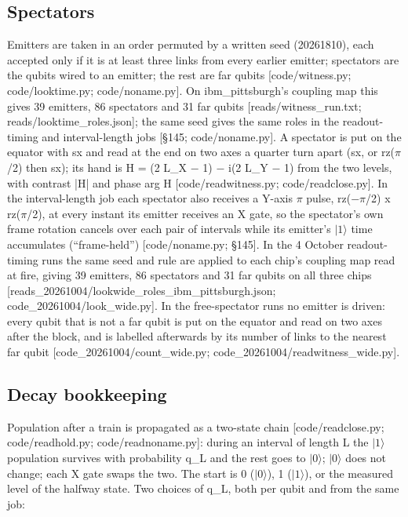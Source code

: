 \documentclass[11pt]{article}
\begin{document}
\subsection{Spectators}
Emitters are taken in an order permuted by a written seed (20261810), each accepted only if it is at least three links from every earlier emitter; spectators are the qubits wired to an emitter; the rest are far qubits {[}code/witness.py; code/looktime.py; code/noname.py{]}. On ibm\_pittsburgh's coupling map this gives 39 emitters, 86 spectators and 31 far qubits {[}reads/witness\_run.txt; reads/looktime\_roles.json{]}; the same seed gives the same roles in the readout-timing and interval-length jobs {[}\S{}145; code/noname.py{]}. A spectator is put on the equator with sx and read at the end on two axes a quarter turn apart (sx, or rz(\(\pi\)/2) then sx); its hand is H = (2 L\_X \(-\) 1) \(-\) i(2 L\_Y \(-\) 1) from the two levels, with contrast |H| and phase arg H {[}code/readwitness.py; code/readclose.py{]}. In the interval-length job each spectator also receives a Y-axis \(\pi\) pulse, rz(\(-\)\(\pi\)/2) x rz(\(\pi\)/2), at every instant its emitter receives an X gate, so the spectator's own frame rotation cancels over each pair of intervals while its emitter's \(|1\rangle\) time accumulates (``frame-held'') {[}code/noname.py; \S{}145{]}. In the 4 October readout-timing runs the same seed and rule are applied to each chip's coupling map read at fire, giving 39 emitters, 86 spectators and 31 far qubits on all three chips {[}reads\_20261004/lookwide\_roles\_ibm\_pittsburgh.json; code\_20261004/look\_wide.py{]}. In the free-spectator runs no emitter is driven: every qubit that is not a far qubit is put on the equator and read on two axes after the block, and is labelled afterwards by its number of links to the nearest far qubit {[}code\_20261004/count\_wide.py; code\_20261004/readwitness\_wide.py{]}.

\subsection{Decay bookkeeping}
Population after a train is propagated as a two-state chain {[}code/readclose.py; code/readhold.py; code/readnoname.py{]}: during an interval of length L the \(|1\rangle\) population survives with probability q\_L and the rest goes to \(|0\rangle\); \(|0\rangle\) does not change; each X gate swaps the two. The start is 0 (\(|0\rangle\)), 1 (\(|1\rangle\)), or the measured level of the halfway state. Two choices of q\_L, both per qubit and from the same job:
\end{document}
